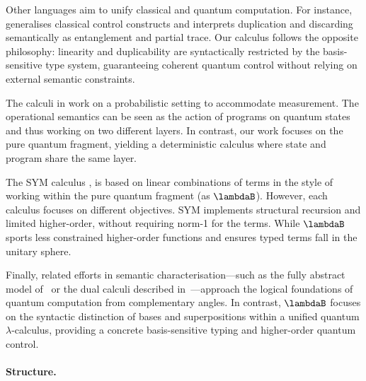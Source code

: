 Other languages aim to unify classical and quantum computation.
For instance,~\cite{VoichickLiRandHicks2023} generalises classical
control constructs and interprets duplication and discarding semantically as
entanglement and partial trace. Our calculus follows the opposite philosophy:
linearity and duplicability are syntactically restricted by the basis-sensitive
type system, guaranteeing coherent quantum control without relying on external
semantic constraints.

The calculi in \cite{DaveLemonnierPechouxZamdzhiev_2025, BarssePechouxPerdrix_2026} work 
on a probabilistic setting to accommodate measurement. The operational semantics can be
seen as the action of programs on quantum states and thus working on two different layers.
In contrast, our work focuses on the pure quantum fragment, yielding a deterministic
calculus where state and program share the same layer.

The SYM calculus \cite{SabryValironVizzotto_2018}, is based on linear combinations of
terms in the style of \cite{ArrighiDowekLMCS17} working within the pure quantum fragment
(as $\lambdaB$). However, each calculus focuses on different objectives. SYM implements 
structural recursion and limited higher-order, without requiring norm-1 for the terms. While 
$\lambdaB$ sports less constrained higher-order functions and ensures typed terms fall in the 
unitary sphere.


Finally, related efforts in semantic characterisation—such as the fully
abstract model of~\cite{ClairambaultdeVisme2019} or the dual calculi
described in~\cite{ChoudhuryGay2025}—approach the logical foundations of
quantum computation from complementary angles.  
In contrast, $\lambdaB$ focuses on the syntactic distinction of bases and
superpositions within a unified quantum $\lambda$-calculus, providing a concrete
basis-sensitive typing and higher-order quantum control.


\paragraph{Structure.}

